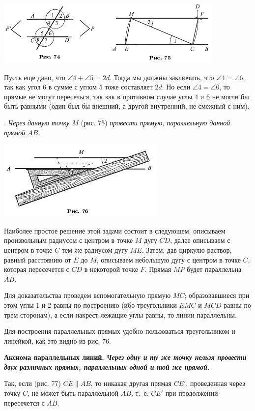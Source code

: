 \documentclass[oneside]{book}
\begin{document}
\includegraphics{pics/ris-74-75}

Пусть еще дано, что $\angle 4 + \angle 5 = 2d$.
Тогда мы должны заключить, что $\angle 4 = \angle 6$, так как угол $6$ в сумме с углом $5$ тоже составляет $2d$.
Но если $\angle 4 = \angle 6$, то прямые не могут пересечься, так как в противном случае углы 4 и 6 не могли бы быть равными (один был бы внешний, а другой внутренний, не смежный с ним).

.
\emph{Через данную точку $M$} (рис. 75) \emph{провести прямую, параллельную данной прямой $AB$.}

\includegraphics{pics/ris-76}

Наиболее простое решение этой задачи состоит в следующем:
описываем произвольным радиусом с центром в точке $M$ дугу $CD$, далее описываем с центром в точке $C$ тем же радиусом дугу $ME$.
Затем, дав циркулю раствор, равный расстоянию от $E$ до $M$, описываем небольшую дугу с центром в точке $C$, которая пересечется с $CD$ в некоторой точке $F$.
Прямая $MP$ будет параллельна $AB$.

Для доказательства проведем вспомогательную прямую $MC$;
образовавшиеся при этом углы 1 и 2 равны по построению (ибо треугольники $EMC$ и $MCD$ равны по трем сторонам), а если накрест лежащие углы равны, то линии параллельны.

Для построения параллельных прямых удобно пользоваться треугольником и линейкой, как это видно из рис. 76.

\textbf{Аксиома параллельных линий.
\emph{Через одну и ту же точку нельзя провести двух различных прямых, параллельных одной и той же прямой.}}

Так, если (рис. 77) $CE\parallel AB$, то никакая другая прямая $CE'$, проведенная через точку $C$, не может быть параллельной $AB$, т.~е. $CE'$ при продолжении пересечется с $AB$.
\end{document}
